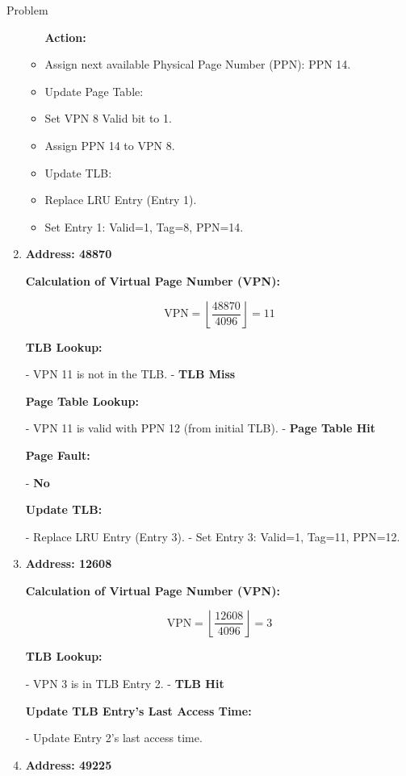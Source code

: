 \begin{problem}{}{Problem}
\begin{enumerate}[label=\arabic*.]
		\begin{itemize}
		\item [\textbf{Action:}]
		\item Assign next available Physical Page Number (PPN): PPN 14.
		\item Update Page Table:
		\item Set VPN 8 Valid bit to 1.
		\item Assign PPN 14 to VPN 8.
		\item Update TLB:
		\item Replace LRU Entry (Entry 1).
		\item Set Entry 1: Valid=1, Tag=8, PPN=14.
	\end{itemize}
		
		\bigskip
		
		\item \textbf{Address: 48870}
		
		\textbf{Calculation of Virtual Page Number (VPN):}
		
		\[
		\text{VPN} = \left\lfloor \dfrac{48870}{4096} \right\rfloor = 11
		\]
		
		\textbf{TLB Lookup:}
		
		- VPN 11 is not in the TLB.
		- \textbf{TLB Miss}
		
		\textbf{Page Table Lookup:}
		
		- VPN 11 is valid with PPN 12 (from initial TLB).
		- \textbf{Page Table Hit}
		
		\textbf{Page Fault:}
		
		- \textbf{No}
		
		\textbf{Update TLB:}
		
		- Replace LRU Entry (Entry 3).
		- Set Entry 3: Valid=1, Tag=11, PPN=12.
		
		\bigskip
		
		\item \textbf{Address: 12608}
		
		\textbf{Calculation of Virtual Page Number (VPN):}
		
		\[
		\text{VPN} = \left\lfloor \dfrac{12608}{4096} \right\rfloor = 3
		\]
		
		\textbf{TLB Lookup:}
		
		- VPN 3 is in TLB Entry 2.
		- \textbf{TLB Hit}
		
		\textbf{Update TLB Entry's Last Access Time:}
		
		- Update Entry 2's last access time.
		
		\bigskip
		
		\item \textbf{Address: 49225}
		

\end{enumerate}
\end{problem}

